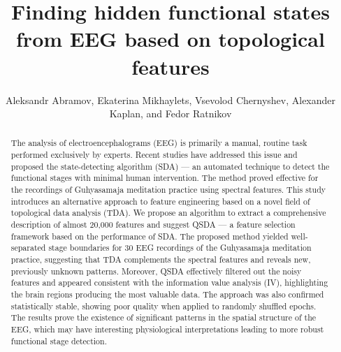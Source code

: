 \documentclass[shortAfour,times,sagev]{sagej}
\begin{document}
\def\journalname{Statistical Methods in Medical Research}

\title{Finding hidden functional states from EEG based on topological features}

\author{Aleksandr Abramov,
Ekaterina Mikhaylets,
Vsevolod Chernyshev,
Alexander Kaplan,
and Fedor Ratnikov}



\newcommand{\abstracttext}{
The analysis of electroencephalograms (EEG) is primarily a manual, routine task performed
exclusively by experts. Recent studies have addressed this issue and proposed the
state-detecting algorithm (SDA) --- an automated technique to detect the functional stages
with minimal human intervention. The method proved effective for the recordings of Guhyasamaja
meditation practice using spectral features. This study introduces an alternative approach
to feature engineering based on a novel field of topological data analysis (TDA). We propose
an algorithm to extract a comprehensive description of almost 20,000 features and suggest
QSDA --- a feature selection framework based on the performance of SDA\@. The proposed
method yielded well-separated stage boundaries for 30 EEG recordings of the Guhyasamaja
meditation practice, suggesting that TDA complements the spectral features and reveals
new, previously unknown patterns. Moreover, QSDA effectively filtered out the noisy features
and appeared consistent with the information value analysis (IV), highlighting the brain
regions producing the most valuable data. The approach was also confirmed statistically stable,
showing poor quality when applied to randomly shuffled epochs. The results prove the existence
of significant patterns in the spatial structure of the EEG, which may have interesting
physiological interpretations leading to more robust functional stage detection.}

\begin{abstract} \abstracttext \end{abstract}

\end{document}
